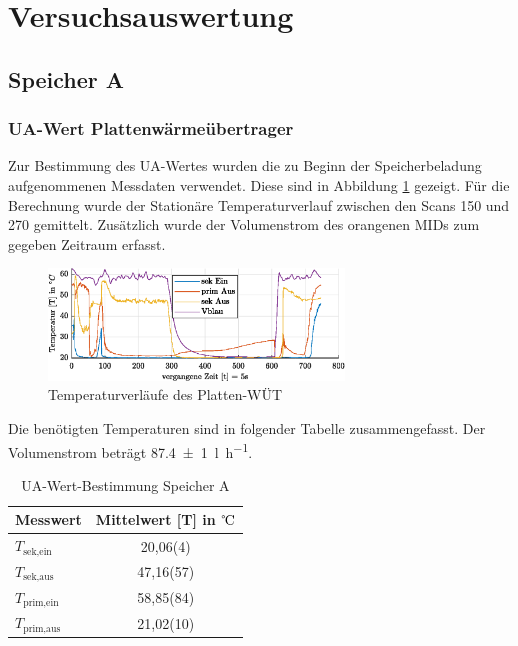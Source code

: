 \section{Versuchsauswertung}

\subsection{Speicher A}

\subsubsection{UA-Wert Plattenwärmeübertrager}
Zur Bestimmung des UA-Wertes wurden die zu Beginn der Speicherbeladung aufgenommenen Messdaten verwendet. Diese sind in Abbildung \ref{fig:extWT} gezeigt. Für die Berechnung wurde der Stationäre Temperaturverlauf zwischen den Scans 150 und 270 gemittelt. Zusätzlich wurde der Volumenstrom des orangenen MIDs zum gegeben Zeitraum erfasst. 

\begin{figure}[H]
	\centering
	\includegraphics[width=0.7\textwidth]{../DATA/PlattenWT_A.eps}
	\caption[Temperaturverläufe des Platten-WÜT]{Temperaturverläufe des Platten-WÜT}
	\label{fig:extWT}
\end{figure}

Die benötigten Temperaturen sind in folgender Tabelle zusammengefasst. Der Volumenstrom beträgt \SI{87,4(1)}{\litre\per\hour}.

\begin{table}[H]
	\centering
	\caption[UA-Wert-Bestimmung Speicher A]{UA-Wert-Bestimmung Speicher A}
	\begin{tabular}{lS[separate-uncertainty,table-parse-only,table-figures-uncertainty = 1]}
		\toprule
		\textbf{Messwert} & {\textbf{Mittelwert} [T] in ${\celsius}$}\\
		\midrule
	$T_{\text{sek,ein}}$ & 20,06(4)\\
	$T_{\text{sek,aus}}$ & 47,16(57)\\
	$T_{\text{prim,ein}}$ & 58,85(84)\\
	$T_{\text{prim,aus}}$ & 21,02(10)\\
		\bottomrule
	\end{tabular}

\label{tab:extWT}
\end{table}

